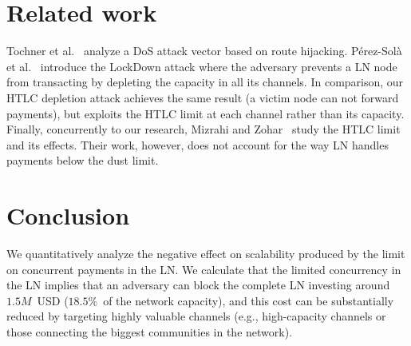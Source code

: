\section{Related work}

Tochner et al.~\cite{Tochner2019} analyze a DoS attack vector based on route hijacking. 
P{\'{e}}rez{-}Sol{\`{a}} et al.~\cite{PerezSola2019} introduce the LockDown attack where the adversary 
prevents a LN node from transacting by depleting the capacity in all its channels.
In comparison, our HTLC depletion attack achieves the same result (a victim node can not forward payments), but exploits the HTLC limit at each channel rather than its capacity.
Finally, concurrently to our research, Mizrahi and Zohar~\cite{Mizrahi2020} study the HTLC limit and its effects.
Their work, however, does not account for the way LN handles payments below the dust limit.

\section{Conclusion}

We quantitatively analyze the negative effect on scalability produced by the limit on concurrent payments in the LN. 
We calculate that the limited concurrency in the LN implies that an adversary can block the complete LN investing around $1.5M$~USD ($18.5\%$~of the network capacity), and this cost can be substantially reduced by targeting highly valuable channels (e.g., high-capacity channels or those connecting the biggest communities in the network).